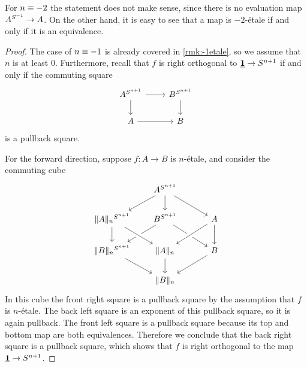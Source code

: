 \documentclass[9pt,twosided]{amsart}
\begin{document}
\begin{rmk}
  For $n\equiv -2$ the statement does not make sense, since there is no evaluation map
  $A^{S^{-1}}\to A$. On the other hand, it is easy to see that a map is $-2$-\'etale if and only if it is an equivalence.
\end{rmk}


\begin{proof}
  The case of $n\equiv -1$ is already covered in \cref{rmk:-1etale}, so we assume that $n$ is at least $0$. Furthermore, recall that $f$ is right orthogonal to $\underline{\mathbf{1}}\to S^{n+1}$ if and only if the commuting square
    \begin{equation}\label{eq:orth}
      \begin{tikzcd}
        A^{\sphere{n+1}} \arrow[r] \arrow[d] & B^{\sphere{n+1}} \arrow[d] \\
        A \arrow[r] & B
      \end{tikzcd}
    \end{equation}
    is a pullback square.

  For the forward direction, suppose $f:A\to B$ is $n$-\'etale, and consider the commuting cube
\begin{equation*}
\begin{tikzcd}
&[-1ex] A^{\sphere{n+1}} \arrow[dl] \arrow[d] \arrow[dr] &[2ex] \\
\trunc{n}{A}^{\sphere{n+1}} \arrow[d] & B^{\sphere{n+1}} \arrow[dl] \arrow[dr] & A \arrow[dl,crossing over] \arrow[d] \\
\trunc{n}{B}^{\sphere{n+1}} \arrow[dr] & \trunc{n}{A} \arrow[d] \arrow[from=ul,crossing over] & B \arrow[dl] \\
& \trunc{n}{B}
\end{tikzcd}
\end{equation*}
In this cube the front right square is a pullback square by the assumption that $f$ is $n$-\'etale. The back left square is an exponent of this pullback square, so it is again pullback. The front left square is a pullback square because its top and bottom map are both equivalences. Therefore we conclude that the back right square is a pullback square, which shows that $f$ is right orthogonal to the map $\underline{\mathbf{1}}\to S^{n+1}$.


\end{proof}
\end{document}
